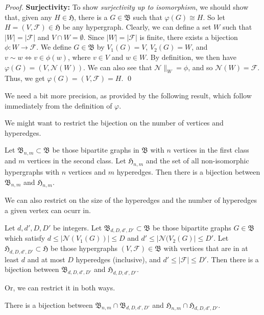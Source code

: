 \begin{proof}
\textbf{Surjectivity:}
To show \emph{surjectivity up to isomorphism}, we should show that, given any $H \in \mathfrak{H}$, there is a $G \in \mathfrak{B}$ such that $\varphi(G) \cong H$.
So let $H = (V, \mathcal{F}) \in \mathfrak{H}$ be any hypergraph.
Clearly, we can define a set $W$ such that $| W | = | \mathcal{F} |$ and $V \cap W = \emptyset$.
Since $| W | = | \mathcal{F} |$ is finite, there exists a bijection $\phi: W \rightarrow \mathcal{F}$.
We define $G \in \mathfrak{B}$ by $V_1(G) = V$, $V_2(G) = W$, and $v \sim w \Leftrightarrow v \in \phi(w)$, where $v \in V$ and $w \in W$.
By definition, we then have $\varphi(G) = (V, \mathcal{N}(W))$.
We can also see that $\mathcal{N} \|_{W} = \phi$, and so $\mathcal{N}(W) = \mathcal{F}$.
Thus, we get $\varphi(G) = (V, \mathcal{F}) = H$.
\qed
\end{proof}

We need a bit more precision, as provided by the following result, which follow immediately from the definition of $\varphi$.

We might want to restrict the bijection on the number of vertices and hyperedges.

\begin{corollary}
Let $\mathfrak{B}_{n,m} \subset \mathfrak{B}$ be those bipartite graphs in $\mathfrak{B}$ with $n$ vertices in the first class and $m$ vertices in the second class.
Let $\mathfrak{H}_{n,m}$ and the set of all non-isomorphic hypergraphs with $n$ vertices and $m$ hyperedges.
Then there is a bijection between $\mathfrak{B}_{n,m}$ and $\mathfrak{H}_{n,m}$.
\end{corollary}

We can also restrict on the size of the hyperedges and the number of hyperedges a given vertex can ocurr in.

\begin{corollary}
Let $d,d',D,D'$ be integers.
Let $\mathfrak{B}_{d,D,d',D'} \subset \mathfrak{B}$ be those bipartite graphs $G \in \mathfrak{B}$ which satisfy $d \leq | \mathcal{N}(V_1(G)) | \leq D$ and $d' \leq | \mathcal{N}(V_2(G) | \leq D'$.
Let $\mathfrak{H}_{d,D,d',D'} \subset \mathfrak{H}$ be those hypergraphs $(V, \mathcal{F}) \in \mathfrak{B}$ with vertices that are in at least $d$ and at most $D$ hyperedges (inclusive), and $d' \leq | \mathcal{F} | \leq D'$.
Then there is a bijection between $\mathfrak{B}_{d,D,d',D'}$ and $\mathfrak{H}_{d,D,d',D'}$.
\end{corollary}

Or, we can restrict it in both ways.

\begin{corollary}
\label{cor:hypergraph_bipartite_bijection}
There is a bijection between $\mathfrak{B}_{n,m} \cap \mathfrak{B}_{d,D,d',D'}$ and $\mathfrak{H}_{n,m} \cap \mathfrak{H}_{d,D,d',D'}$.
\end{corollary}
